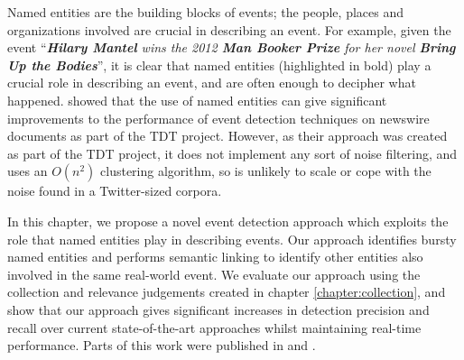 
Named entities are the building blocks of events; the people, places and organizations involved are crucial in describing an event. For example, given the event ``\textit{\textbf{Hilary Mantel} wins the 2012 \textbf{Man Booker Prize} for her novel \textbf{Bring Up the Bodies}}'', it is clear that named entities (highlighted in bold) play a crucial role in describing an event, and are often enough to decipher what happened. \cite{Kumaran:2004:TCN:1008992.1009044, Kumaran2005} showed that the use of named entities can give significant improvements to the performance of event detection techniques on newswire documents as part of the TDT project.
However, as their approach was created as part of the TDT project, it does not implement any sort of noise filtering, and uses an $O(n^2)$ clustering algorithm,  so is unlikely to scale or cope with the noise found in a Twitter-sized corpora.

In this chapter, we propose a novel event detection approach which exploits the role that named entities play in describing events.
Our approach identifies bursty named entities and performs semantic linking to identify other entities also involved in the same real-world event.
We evaluate our approach using the collection and relevance judgements created in chapter \ref{chapter:collection}, and show that our approach gives significant increases in detection precision and recall over current state-of-the-art approaches whilst maintaining real-time performance.
Parts of this work were published in \cite{McMinn15} and \cite{McMinn14}.
